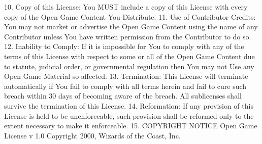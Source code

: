{10. Copy of this License: You MUST include a copy of this License with every copy of the Open Game Content You Distribute.
11. Use of Contributor Credits: You may not market or advertise the Open Game Content using the name of any Contributor unless You have written permission from the Contributor to do so.
12. Inability to Comply: If it is impossible for You to comply with any of the terms of this License with respect to some or all of the Open Game Content due to statute, judicial order, or governmental regulation then You may not Use any Open Game Material so affected.
13. Termination: This License will terminate automatically if You fail to comply with all terms herein and fail to cure such breach within 30 days of becoming aware of the breach. All sublicenses shall survive the termination of this License.
14. Reformation: If any provision of this License is held to be unenforceable, such provision shall be reformed only to the extent necessary to make it enforceable.
15. COPYRIGHT NOTICE
Open Game License v 1.0 Copyright 2000, Wizards of the Coast, Inc.
}

